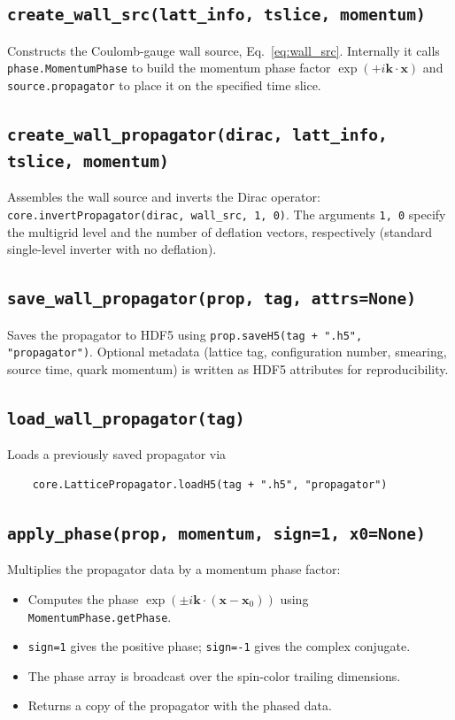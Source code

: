 \documentclass[11pt,a4paper]{article}
\newcommand{\walltag}[1]{\texttt{#1}}
\begin{document}
\subsection{\walltag{create\_wall\_src(latt\_info, tslice, momentum)}}

Constructs the Coulomb-gauge wall source, Eq.~\eqref{eq:wall_src}.  Internally it
calls \walltag{phase.MomentumPhase} to build the momentum phase factor
$\exp(+i\mathbf{k}\!\cdot\!\mathbf{x})$ and \walltag{source.propagator} to place it
on the specified time slice.

\subsection{\walltag{create\_wall\_propagator(dirac, latt\_info, tslice, momentum)}}

Assembles the wall source and inverts the Dirac operator:
\walltag{core.invertPropagator(dirac, wall\_src, 1, 0)}.  The arguments \walltag{1, 0}
specify the multigrid level and the number of deflation vectors, respectively
(standard single-level inverter with no deflation).

\subsection{\walltag{save\_wall\_propagator(prop, tag, attrs=None)}}

Saves the propagator to HDF5 using \walltag{prop.saveH5(tag + ".h5", "propagator")}.
Optional metadata (lattice tag, configuration number, smearing, source time, quark
momentum) is written as HDF5 attributes for reproducibility.

\subsection{\walltag{load\_wall\_propagator(tag)}}

Loads a previously saved propagator via
\begin{verbatim}
    core.LatticePropagator.loadH5(tag + ".h5", "propagator")
\end{verbatim}

\subsection{\walltag{apply\_phase(prop, momentum, sign=1, x0=None)}}

Multiplies the propagator data by a momentum phase factor:

\begin{itemize}[nosep]
  \item Computes the phase $\exp(\pm i\mathbf{k}\!\cdot\!(\mathbf{x}-\mathbf{x}_{0}))$
        using \walltag{MomentumPhase.getPhase}.
  \item \walltag{sign=1} gives the positive phase; \walltag{sign=-1} gives the
        complex conjugate.
  \item The phase array is broadcast over the spin-color trailing dimensions.
  \item Returns a copy of the propagator with the phased data.
\end{itemize}
\end{document}
